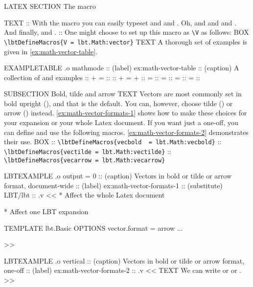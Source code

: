 \begin{lbt}
    LATEX \FloatBarrier
    SECTION The  macro

    TEXT
    :: With the  macro you can easily typeset  and  and . Oh, and  and  and . And finally,  and .
    :: One might choose to set up this macro as \Verb|\V| as follows:
    BOX \verb|\lbtDefineMacros{V = lbt.Math:vector}|
    TEXT A thorough set of examples is given in \vref{ex:math-vector-table}.

    EXAMPLETABLE .o mathmode
    :: (label) ex:math-vector-table
    :: (caption) A collection of  and  examples
    ::  +  = 
    :: 
    ::  +  =  + 
    ::  = 
    ::  = 
    ::  = 
    ::  = 
    :: 

    SUBSECTION Bold, tilde and arrow
    TEXT Vectors are most commonly set in bold upright (), and that is the \lbtlogo{} default. You can, however, choose tilde () or arrow () instead. \vref{ex:math-vector-formats-1} shows how to make these choices for your \lbtlogo{} expansion or your whole Latex document. If you want just a one-off, you can define and use the following macros. \vref{ex:math-vector-formats-2} demonstrates their use.
    BOX
    :: \verb|\lbtDefineMacros{vecbold  = lbt.Math:vecbold}|
    :: \verb|\lbtDefineMacros{vectilde = lbt.Math:vectilde}|
    :: \verb|\lbtDefineMacros{vecarrow = lbt.Math:vecarrow}|

    LBTEXAMPLE .o output = 0
    :: (caption) Vectors in bold or tilde or arrow format, document-wide
    :: (label) ex:math-vector-formats-1
    :: (substitute) LBT/lbt
    :: .v <<
      * Affect the whole Latex document

      * Affect one LBT expansion
      \begin{LBT}
        [@META]
          TEMPLATE lbt.Basic
          OPTIONS  vector.format = arrow
        ...
      \end{LBT}
    >>

    LBTEXAMPLE .o vertical
    :: (caption) Vectors in bold or tilde or arrow format, one-off
    :: (label) ex:math-vector-formats-2
    :: .v <<
      TEXT We can write  or  or .
    >>


\end{lbt}
